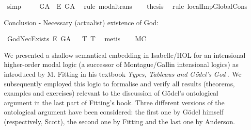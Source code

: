 \begin{isabellebody}
\ simp\isanewline
\ \ \isamarkupfalse%
\ {\isachardoublequoteopen}{\isasymlfloor}\isactrlbold {\isasymdiamond}\isactrlbold {\isasymexists}\ G\isactrlsup A\ \isactrlbold {\isasymrightarrow}\ \isactrlbold {\isasymbox}\isactrlbold {\isasymexists}\isactrlsup E\ G\isactrlsup A{\isasymrfloor}{\isachardoublequoteclose}\ \isamarkupfalse%
\ {\isacharparenleft}rule\ modal{\isacharunderscore}trans{\isacharparenright}\isanewline
\ \ \isamarkupfalse%
\ {\isacharquery}thesis\ \isamarkupfalse%
\ {\isacharparenleft}rule\ localImpGlobalCons{\isacharparenright}\isanewline
{}\isamarkupfalse%
%
%
%
%
\begin{isamarkuptext}%
Conclusion - Necessary (actualist) existence of God:%
\end{isamarkuptext}\isamarkuptrue%
\isamarkupfalse%
\ GodNecExists{\isacharcolon}\ {\isachardoublequoteopen}{\isasymlfloor}\isactrlbold {\isasymbox}\isactrlbold {\isasymexists}\isactrlsup E\ G\isactrlsup A{\isasymrfloor}{\isachardoublequoteclose}%
\ %
%
\isamarkupfalse%
\ T{}\ T{}\ \isamarkupfalse%
\ metis%
%
%
\ \ \isanewline
{}\isamarkupfalse%
\ MC{\isacharcolon}\ {\isachardoublequoteopen}{\isasymlfloor}\isactrlbold {\isasymforall}{\isasymPhi}{\isachardot}{\isacharparenleft}{\isasymPhi}\ \isactrlbold {\isasymrightarrow}\ {\isacharparenleft}\isactrlbold {\isasymbox}\ {\isasymPhi}{\isacharparenright}{\isacharparenright}{\isasymrfloor}{\isachardoublequoteclose}\ \isamarkupfalse%
%
\ %
%
\isamarkupfalse%
\ %
%
%
%
%
\isamarkuptrue%
%
\begin{isamarkuptext}%
We presented a shallow semantical embedding in Isabelle/HOL for an intensional higher-order modal logic
(a successor of Montague/Gallin intensional logics) as introduced by M. Fitting in his textbook \emph{Types, Tableaus and 
G\"odel's God} \cite{Fitting}. 
We subsequently employed this logic to formalise and verify all results (theorems, examples and exercises) relevant 
to the discussion of G\"odel's ontological argument in the last part of Fitting's book. Three different versions of
the ontological argument have been considered: the first one by G\"odel himself (respectively, Scott), the second 
one by Fitting and the last one by Anderson.%
\end{isamarkuptext}\isamarkuptrue%
%
\begin{isamarkuptext}%

\end{isamarkuptext}
\end{isabellebody}
